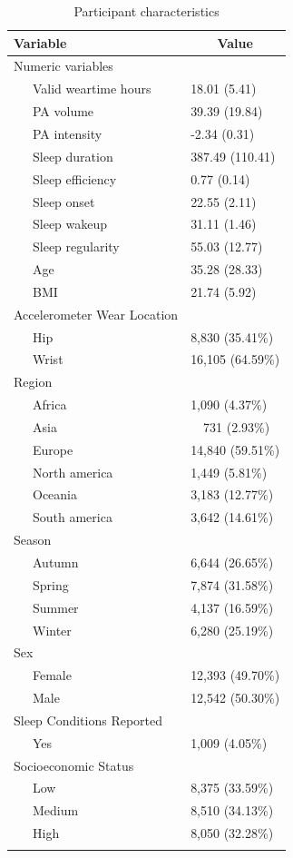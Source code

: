 \documentclass[
  man]{apa6}
\begin{document}
\begin{table}[tbp]

\begin{center}
\begin{threeparttable}

\caption{\label{tab:demo-participants}Participant characteristics}

\begin{tabular}{ll}
\toprule
Variable & \multicolumn{1}{c}{Value}\\
\midrule
Numeric variables & \\
\ \ \ Valid weartime hours & 18.01 (5.41)\\
\ \ \ PA volume & 39.39 (19.84)\\
\ \ \ PA intensity & -2.34 (0.31)\\
\ \ \ Sleep duration & 387.49 (110.41)\\
\ \ \ Sleep efficiency & 0.77 (0.14)\\
\ \ \ Sleep onset & 22.55 (2.11)\\
\ \ \ Sleep wakeup & 31.11 (1.46)\\
\ \ \ Sleep regularity & 55.03 (12.77)\\
\ \ \ Age & 35.28 (28.33)\\
\ \ \ BMI & 21.74 (5.92)\\
Accelerometer Wear Location & \\
\ \ \ Hip & 8,830 (35.41\%)\\
\ \ \ Wrist & 16,105 (64.59\%)\\
Region & \\
\ \ \ Africa & 1,090 (4.37\%)\\
\ \ \ Asia & \ \  731 (2.93\%)\\
\ \ \ Europe & 14,840 (59.51\%)\\
\ \ \ North america & 1,449 (5.81\%)\\
\ \ \ Oceania & 3,183 (12.77\%)\\
\ \ \ South america & 3,642 (14.61\%)\\
Season & \\
\ \ \ Autumn & 6,644 (26.65\%)\\
\ \ \ Spring & 7,874 (31.58\%)\\
\ \ \ Summer & 4,137 (16.59\%)\\
\ \ \ Winter & 6,280 (25.19\%)\\
Sex & \\
\ \ \ Female & 12,393 (49.70\%)\\
\ \ \ Male & 12,542 (50.30\%)\\
Sleep Conditions Reported & \\
\ \ \ Yes & 1,009 (4.05\%)\\
Socioeconomic Status & \\
\ \ \ Low & 8,375 (33.59\%)\\
\ \ \ Medium & 8,510 (34.13\%)\\
\ \ \ High & 8,050 (32.28\%)\\
\bottomrule
\addlinespace
\end{tabular}


\end{threeparttable}
\end{center}
\end{table}
\end{document}
